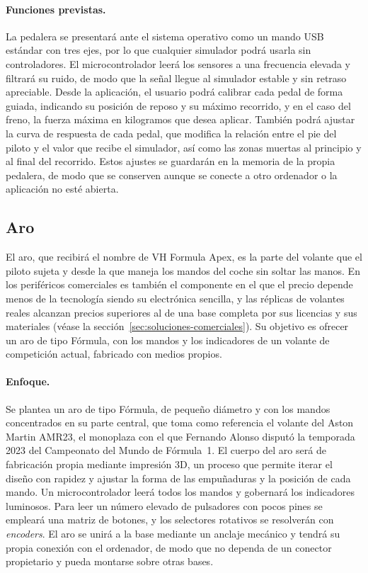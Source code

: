 \paragraph{Funciones previstas.}
La pedalera se presentará ante el sistema operativo como un mando USB estándar con tres ejes, por lo que cualquier simulador podrá usarla sin controladores. El microcontrolador leerá los sensores a una frecuencia elevada y filtrará su ruido, de modo que la señal llegue al simulador estable y sin retraso apreciable. Desde la aplicación, el usuario podrá calibrar cada pedal de forma guiada, indicando su posición de reposo y su máximo recorrido, y en el caso del freno, la fuerza máxima en kilogramos que desea aplicar. También podrá ajustar la curva de respuesta de cada pedal, que modifica la relación entre el pie del piloto y el valor que recibe el simulador, así como las zonas muertas al principio y al final del recorrido. Estos ajustes se guardarán en la memoria de la propia pedalera, de modo que se conserven aunque se conecte a otro ordenador o la aplicación no esté abierta.

\subsection{Aro}
\label{sec:propuesta-aro}

El aro, que recibirá el nombre de VH Formula Apex, es la parte del volante que el piloto sujeta y desde la que maneja los mandos del coche sin soltar las manos. En los periféricos comerciales es también el componente en el que el precio depende menos de la tecnología siendo su electrónica sencilla, y las réplicas de volantes reales alcanzan precios superiores al de una base completa por sus licencias y sus materiales (véase la sección~\ref{sec:soluciones-comerciales}). Su objetivo es ofrecer un aro de tipo Fórmula, con los mandos y los indicadores de un volante de competición actual, fabricado con medios propios.

\paragraph{Enfoque.}
Se plantea un aro de tipo Fórmula, de pequeño diámetro y con los mandos concentrados en su parte central, que toma como referencia el volante del Aston Martin AMR23, el monoplaza con el que Fernando Alonso disputó la temporada 2023 del Campeonato del Mundo de Fórmula~1. El cuerpo del aro será de fabricación propia mediante impresión 3D, un proceso que permite iterar el diseño con rapidez y ajustar la forma de las empuñaduras y la posición de cada mando. Un microcontrolador leerá todos los mandos y gobernará los indicadores luminosos. Para leer un número elevado de pulsadores con pocos pines se empleará una matriz de botones, y los selectores rotativos se resolverán con \textit{encoders}. El aro se unirá a la base mediante un anclaje mecánico y tendrá su propia conexión con el ordenador, de modo que no dependa de un conector propietario y pueda montarse sobre otras bases.

